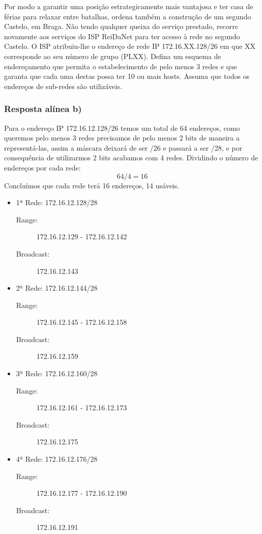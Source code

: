 \documentclass{article}
\begin{document}
Por modo a garantir uma posição estrategicamente mais vantajosa e ter casa de férias para relaxar entre batalhas,
ordena também a construção de um segundo Castelo, em Braga. Não tendo qualquer queixa do serviço prestado,
recorre novamente aos serviços do ISP ReiDaNet para ter acesso à rede no segundo Castelo. O ISP atribuiu-lhe
o endereço de rede IP 172.16.XX.128/26 em que XX corresponde ao seu número de grupo (PLXX). Defina um
esquema de endereçamento que permita o estabelecimento de pelo menos 3 redes e que garanta que cada uma
destas possa ter 10 ou mais hosts. Assuma que todos os endereços de sub-redes são utilizáveis.

\subsubsection{Resposta alínea b)}

Para o endereço IP 172.16.12.128/26 temos um total de 64 endereços, como queremos pelo menos 3 redes precisamos de pelo menos 2 bits de maneira a representá-las, assim a máscara deixará de ser /26 e passará a ser /28, e por consequência de utilizarmos 2 bits acabamos com 4 redes. Dividindo o número de endereços por cada rede: \[64/4 = 16\] Concluímos que cada rede terá 16 endereços, 14 usáveis.

\begin{itemize}
    \item 1ª Rede: 172.16.12.128/28
    \begin{description}
        \item[Range:] 172.16.12.129 - 172.16.12.142    
        \item[Broadcast:] 172.16.12.143
    \end{description}
    \item 2ª Rede: 172.16.12.144/28
    \begin{description}
        \item[Range:] 172.16.12.145 - 172.16.12.158      
        \item[Broadcast:] 172.16.12.159 
    \end{description}
    \item 3ª Rede: 172.16.12.160/28
    \begin{description}
        \item[Range:] 172.16.12.161 - 172.16.12.173   
        \item[Broadcast:] 172.16.12.175
    \end{description}
    \bigskip
    \item 4ª Rede: 172.16.12.176/28
    \begin{description}
        \item[Range:] 172.16.12.177 - 172.16.12.190    
        \item[Broadcast:] 172.16.12.191
    \end{description}
\end{itemize}
\end{document}
